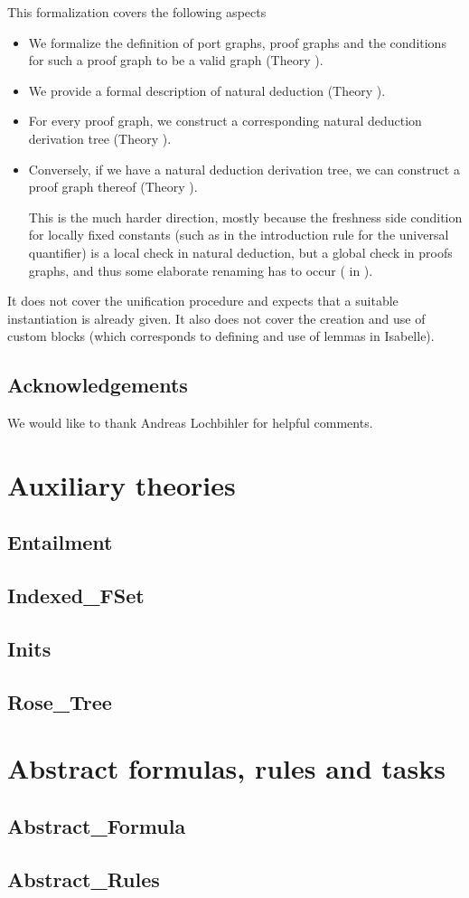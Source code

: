 \documentclass[11pt,a4paper,parskip=half]{scrartcl}
\begin{document}
This formalization covers the following aspects
\begin{itemize}
\item We formalize the definition of port graphs, proof graphs and the conditions for such a proof
      graph to be a valid graph (Theory ).
\item We provide a formal description of natural deduction (Theory ).
\item For every proof graph, we construct a corresponding natural deduction derivation tree
      (Theory  ).
\item Conversely, if we have a natural deduction derivation tree, we can construct a proof graph
      thereof (Theory ).
      
      This is the much harder direction, mostly because the freshness side condition for locally
      fixed constants (such as in the introduction rule for the universal quantifier) is a local
      check in natural deduction, but a global check in proofs graphs, and thus some elaborate
      renaming has to occur ( in ).
\end{itemize}

It does not cover the unification procedure and expects that a suitable instantiation is already
given. It also does not cover the creation and use of custom blocks (which corresponds to defining 
and use of lemmas in Isabelle).


\subsection{Acknowledgements}

We would like to thank Andreas Lochbihler for helpful comments.

\clearpage
\newcommand{\theory}[1]{\subsection{#1}\label{sec\string_#1}}

\section{Auxiliary theories}
\label{ch\string_aux}

\theory{Entailment}
\theory{Indexed\string_FSet}
\theory{Inits}
\theory{Rose\string_Tree}

\section{Abstract formulas, rules and tasks}
\theory{Abstract\string_Formula}
\theory{Abstract\string_Rules}
\end{document}
